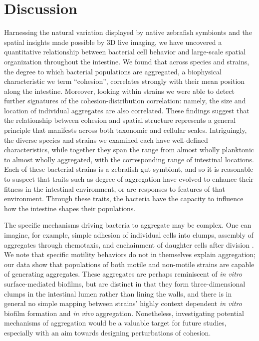  \section{Discussion}	

Harnessing the natural variation displayed by native zebrafish symbionts and the spatial insights made possible by 3D live imaging, we have uncovered a quantitative relationship between bacterial cell behavior and large-scale spatial organization throughout the intestine. We found that across species and strains, the degree to which bacterial populations are aggregated, a biophysical characteristic we term ``cohesion'', correlates strongly with their mean position along the intestine. Moreover, looking within strains we were able to detect further signatures of the cohesion-distribution correlation: namely, the size and location of individual aggregates are also correlated. These findings suggest that the relationship between cohesion and spatial structure represents a general principle that manifests across both taxonomic and cellular scales. Intriguingly, the diverse species and strains we examined each have well-defined characteristics, while together they span the range from almost wholly planktonic to almost wholly aggregated, with the corresponding range of intestinal locations. Each of these bacterial strains is a zebrafish gut symbiont, and so it is reasonable to suspect that traits such as degree of aggregation have evolved to enhance their fitness in the intestinal environment, or are responses to features of that environment. Through these traits, the bacteria have the capacity to influence how the intestine shapes their populations.

The specific mechanisms driving bacteria to aggregate may be complex. One can imagine, for example, simple adhesion of individual cells into clumps, assembly of aggregates through chemotaxis, and enchainment of daughter cells after division \mbox{\cite{Moor2017}}. We note that specific motility behaviors do not in themselves explain aggregation; our data show that populations of both motile and non-motile strains \mbox{\cite{Wiles2018}} are capable of generating aggregates. These aggregates are perhaps reminiscent of \textit{in vitro} surface-mediated biofilms, but are distinct in that they form three-dimensional clumps in the intestinal lumen rather than lining the walls, and there is in general no simple mapping between strains' highly context dependent \textit{in vitro} biofilm formation and \textit{in vivo} aggregation. Nonetheless, investigating potential mechanisms of aggregation would be a valuable target for future studies, especially with an aim towards designing perturbations of cohesion.

